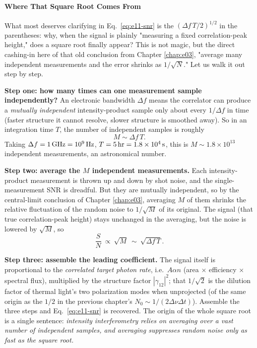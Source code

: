 \paragraph{Where That Square Root Comes From}
\label{sec:e11-snr-sqrt}

What most deserves clarifying in Eq.~\eqref{eq:e11-snr} is the \((\Delta f\,T/2)^{1/2}\) in the parentheses: why, when the signal is plainly "measuring a fixed correlation-peak height," does a square root finally appear? This is not magic, but the direct cashing-in here of that old conclusion from Chapter \ref{chap:e03}, "average many independent measurements and the error shrinks as \(1/\sqrt{N}\)." Let us walk it out step by step.

\textbf{Step one: how many times can one measurement sample independently?} An electronic bandwidth \(\Delta f\) means the correlator can produce a \emph{mutually independent} intensity-product sample only about every \(1/\Delta f\) in time (faster structure it cannot resolve, slower structure is smoothed away). So in an integration time \(T\), the number of independent samples is roughly
\[
  M \sim \Delta f\,T .
\]
Taking \(\Delta f=1\,{\rm GHz}=10^9\,{\rm Hz}\), \(T=5\,{\rm hr}=1.8\times10^4\,{\rm s}\), this is \(M\sim1.8\times10^{13}\) independent measurements, an astronomical number.

\textbf{Step two: average the \(M\) independent measurements.} Each intensity-product measurement is thrown up and down by shot noise, and the single-measurement SNR is dreadful. But they are mutually independent, so by the central-limit conclusion of Chapter \ref{chap:e03}, averaging \(M\) of them shrinks the relative fluctuation of the random noise to \(1/\sqrt{M}\) of its original. The signal (that true correlation-peak height) stays unchanged in the averaging, but the noise is lowered by \(\sqrt{M}\), so
\[
  \frac{S}{N}\ \propto\ \sqrt{M}\ \sim\ \sqrt{\Delta f\,T}.
\]

\textbf{Step three: assemble the leading coefficient.} The signal itself is proportional to the \emph{correlated target photon rate}, i.e.\ \(A\alpha n\) (area \(\times\) efficiency \(\times\) spectral flux), multiplied by the structure factor \(|\gamma_{12}|^2\); that \(1/\sqrt2\) is the dilution factor of thermal light's two polarization modes when unprojected (of the same origin as the \(1/2\) in the previous chapter's \(N_0\sim1/(2\Delta\nu\Delta t)\)). Assemble the three steps and Eq.~\eqref{eq:e11-snr} is recovered. The origin of the whole square root is a single sentence: \emph{intensity interferometry relies on averaging over a vast number of independent samples, and averaging suppresses random noise only as fast as the square root.}

